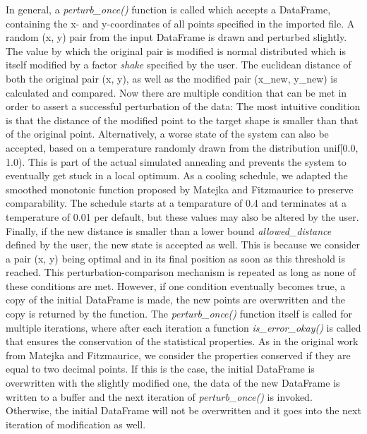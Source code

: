 \documentclass[sigconf]{acmart}
\begin{document}
In general, a \textit{perturb\_once()} function is called which accepts a DataFrame, containing the x- and y-coordinates of all points specified in the imported file. A random (x, y) pair from the input DataFrame is drawn and perturbed slightly. The value by which the original pair is modified is normal distributed which is itself modified by a factor \textit{shake} specified by the user. The euclidean distance of both the original pair (x, y), as well as the modified pair (x\_new, y\_new) is calculated and compared. Now there are multiple condition that can be met in order to assert a successful perturbation of the data:\newline
The most intuitive condition is that the distance of the modified point to the target shape is smaller than that of the original point. Alternatively, a worse state of the system can also be accepted, based on a temperature randomly drawn from the distribution unif[0.0, 1.0). This is part of the actual simulated annealing and prevents the system to eventually get stuck in a local optimum. As a cooling schedule, we adapted the smoothed monotonic function proposed by Matejka and Fitzmaurice to preserve comparability. The schedule starts at a temparature of 0.4 and terminates at a temperature of 0.01 per default, but these values may also be altered by the user. Finally, if the new distance is smaller than a lower bound \textit{allowed\_distance} defined by the user, the new state is accepted as well. This is because we consider a pair (x, y) being optimal and in its final position as soon as this threshold is reached.\newline
This perturbation-comparison mechanism is repeated as long as none of these conditions are met. However, if one condition eventually becomes true, a copy of the initial DataFrame is made, the new points are overwritten and the copy is returned by the function.\newline
The \textit{perturb\_once()} function itself is called for multiple iterations, where after each iteration a function \textit{is\_error\_okay()} is called that ensures the conservation of the statistical properties. As in the original work from Matejka and Fitzmaurice, we consider the properties conserved if they are equal to two decimal points. If this is the case, the initial DataFrame is overwritten with the slightly modified one, the data of the new DataFrame is written to a buffer and the next iteration of \textit{perturb\_once()} is invoked. Otherwise, the initial DataFrame will not be overwritten and it goes into the next iteration of modification as well.
\end{document}
